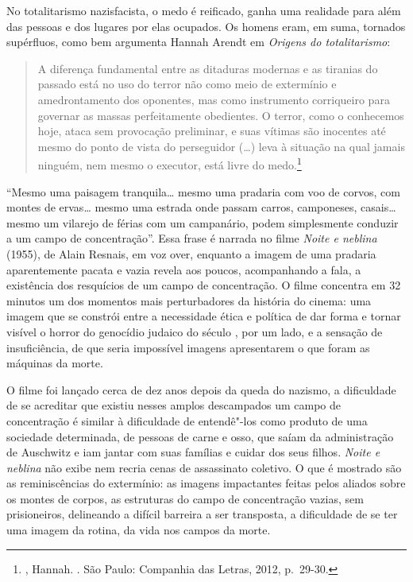 No totalitarismo nazisfacista, o medo é reificado, ganha uma realidade
para além das pessoas e dos lugares por elas ocupados. Os homens eram,
em suma, tornados supérfluos, como bem argumenta Hannah Arendt em
\emph{Origens do totalitarismo}:

\begin{quote}
A diferença fundamental entre as ditaduras modernas e as tiranias do
passado está no uso do terror não como meio de extermínio e
amedrontamento dos oponentes, mas como instrumento corriqueiro para
governar as massas perfeitamente obedientes. O terror, como o conhecemos
hoje, ataca sem provocação preliminar, e suas vítimas são inocentes até
mesmo do ponto de vista do perseguidor (\ldots{}) leva à situação na qual
jamais ninguém, nem mesmo o executor, está livre do medo.\footnote{,
  Hannah. {}. São Paulo: Companhia das Letras, 2012, p.~29-30.}
\end{quote}

\asterisc

``Mesmo uma paisagem tranquila\ldots{} mesmo uma pradaria com voo de corvos,
com montes de ervas\ldots{} mesmo uma estrada onde passam carros, camponeses,
casais\ldots{} mesmo um vilarejo de férias com um campanário, podem
simplesmente conduzir a um campo de concentração''. Essa frase é
narrada no filme \emph{Noite e neblina} (1955), de Alain Resnais, em voz over,
enquanto a imagem de uma pradaria aparentemente pacata e vazia revela
aos poucos, acompanhando a fala, a existência dos resquícios de um campo
de concentração. O filme concentra em 32 minutos um dos momentos mais
perturbadores da história do cinema: uma imagem que se constrói entre a
necessidade ética e política de dar forma e tornar visível o horror do
genocídio judaico do século , por um lado, e a sensação de
insuficiência, de que seria impossível imagens apresentarem o que foram as máquinas da morte.

O filme foi lançado cerca de dez anos depois da queda do nazismo, a dificuldade de
se acreditar que existiu nesses amplos descampados um campo de
concentração é similar à dificuldade de entendê"-los como produto de uma
sociedade determinada, de pessoas de carne e osso, que saíam da
administração de Auschwitz e iam jantar com suas famílias e cuidar dos
seus filhos. \emph{Noite e neblina} não exibe nem recria cenas de
assassinato coletivo. O que é mostrado são as reminiscências do
extermínio: as imagens impactantes feitas pelos aliados sobre os montes
de corpos, as estruturas do campo de concentração vazias, sem
prisioneiros, delineando a difícil barreira a ser transposta, a
dificuldade de se ter uma imagem da rotina, da vida nos campos da morte.

